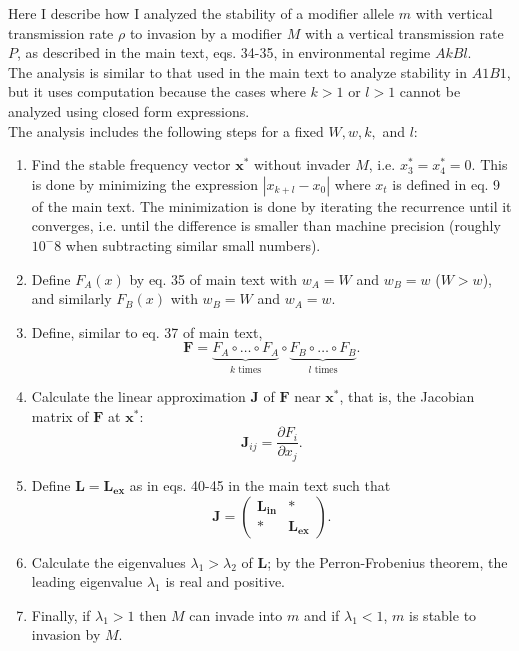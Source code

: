 \documentclass[11pt, oneside]{article}   	%
\let\vec\mathbf
\begin{document}
Here I describe how I analyzed the stability of a modifier allele $m$ with vertical transmission rate $\rho$ to invasion by a modifier $M$ with a vertical transmission rate $P$, as described in the main text, eqs. 34-35, in environmental regime $AkBl$.
\\
The analysis is similar to that used in the main text to analyze stability in $A1B1$, but it uses computation because the cases where $k>1$ or $l>1$ cannot be analyzed using closed form expressions.
\\
The analysis includes the following steps for a fixed $W, w, k,$ and $l$:
\begin{enumerate}

\item Find the stable frequency vector $\vec{x^*}$ without invader $M$, i.e. $x^*_3=x^*_4=0$. This is done by minimizing the expression $|x_{k+l} - x_{0}|$ where $x_{t}$ is defined in eq. 9 of the main text. The minimization is done by iterating the recurrence until it converges, i.e. until the difference is smaller than machine precision (roughly $10^-8$ when subtracting similar small numbers).

\item Define $F_A(x)$ by eq. 35 of main text with $w_A=W$ and $w_B=w$ ($W>w$), and similarly $F_B(x)$ with $w_B=W$ and $w_A=w$.

\item Define, similar to eq. 37 of main text,
\begin{equation}
\vec{F} = \underbrace{F_A \circ \ldots \circ F_A}_{k \text{ times}} \circ
	\underbrace{F_B \circ \ldots \circ F_B}_{l \text{ times}}.
\label{eq:F}\end{equation}

\item Calculate the linear approximation $\vec{J}$ of $\vec{F}$  near $\vec{x^*}$, that is, the Jacobian matrix of $\vec{F}$ at $\vec{x^*}$:
\begin{equation}
\vec{J}_{ij} = \frac{\partial F_i}{\partial x_j}.
\label{eq:jacobian}\end{equation}

\item Define $\vec{L}=\vec{L_{ex}}$ as in eqs. 40-45 in the main text such that
\begin{equation}
\vec{J} = \begin{pmatrix}
\vec{L_{in}} & * \\
* & \vec{L_{ex}}
\end{pmatrix}.
\end{equation}

\item Calculate the eigenvalues $\lambda_1 > \lambda_2$ of $\vec{L}$; by the Perron-Frobenius theorem, the leading eigenvalue $\lambda_1$ is real and positive.

\item Finally, if $\lambda_1>1$ then $M$ can invade into $m$ and if $\lambda_1<1$, $m$ is stable to invasion by $M$.

\end{enumerate}
\end{document}
